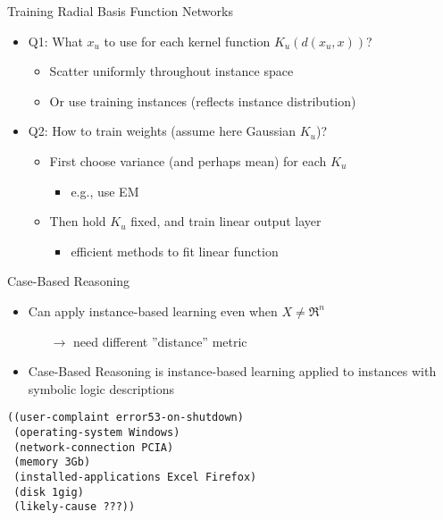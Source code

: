 \documentclass[%
pdf,
colorBG,
slideColor,
tcrico,
]{prosper}
\begin{document}
\begin{slide}{Training Radial Basis Function Networks }
\begin{itemize}
 \item Q1: What $x_u$ to use for each kernel function $K_u(d(x_u,x))$?
	\begin{itemize}
	\item Scatter uniformly throughout instance space 
	\item Or use training instances (reflects instance distribution) 
	\end{itemize}
\item  Q2: How to train weights (assume here Gaussian $K_u$)?
	\begin{itemize}
	\item First choose variance (and perhaps mean) for each $K_u$
	\begin{itemize} \item e.g., use EM \end{itemize}
	\item Then hold $K_u$ fixed, and train linear output layer
	\begin{itemize} \item efficient methods to fit linear function \end{itemize}
	\end{itemize}
\end{itemize}
\end{slide}


\begin{slide}{Case-Based Reasoning }
\tiny
\begin{itemize}
 \item  Can apply instance-based learning even when $X \neq \Re^n$
\begin{itemize} \item[$\rightarrow$] need different ''distance'' metric \end{itemize}
\item Case-Based Reasoning is instance-based learning applied to instances with symbolic logic descriptions
\end{itemize}
\begin{verbatim}
((user-complaint error53-on-shutdown)
 (operating-system Windows)
 (network-connection PCIA)
 (memory 3Gb)
 (installed-applications Excel Firefox)
 (disk 1gig)
 (likely-cause ???))
\end{verbatim}
\end{slide}
\end{document}
